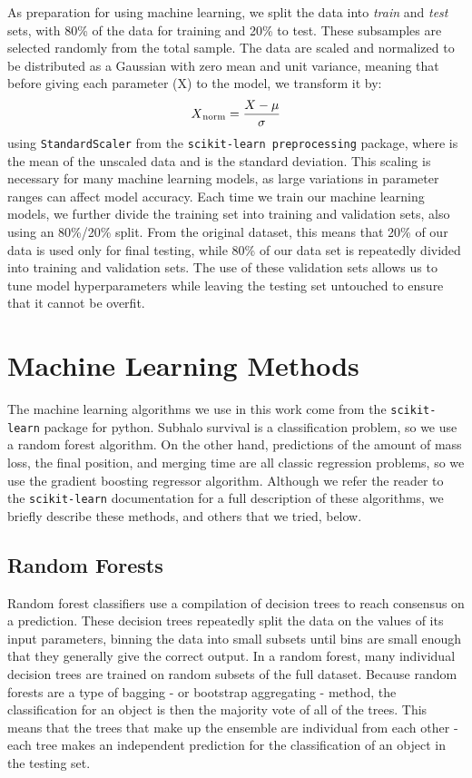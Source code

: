 \documentclass[fleqn,usenatbib]{mnras}
\begin{document}
\par
    As preparation for using machine learning, we split the data into \textit{train}  and \textit{test} sets, with 80\% of the data for training and 20\% to test. These subsamples are selected randomly from the total sample. The data are scaled and normalized to be distributed as a Gaussian with zero mean and unit variance, meaning that before giving each parameter (X) to the model, we transform it by: 
    \begin{equation}
        X\textsubscript{norm} = \frac{X - \mu}{\sigma}
    \end{equation} 
    using \texttt{StandardScaler} from the \texttt{scikit-learn preprocessing} package, where \textmu{} is the mean of the unscaled data and \textsigma{} is the standard deviation. This scaling is necessary for many machine learning models, as large variations in parameter ranges can affect model accuracy.
    Each time we train our machine learning models, we further divide the training set into training and validation sets, also using an 80\%/20\% split. From the original dataset, this means that 20\% of our data is used only for final testing, while 80\% of our data set is repeatedly divided into training and validation sets. The use of these validation sets allows us to tune model hyperparameters while leaving the testing set untouched to ensure that it cannot be overfit.

\section{Machine Learning Methods}
\label{sec:ML Methods}
The machine learning algorithms we use in this work come from the \texttt{scikit-learn} package for python. Subhalo survival is a classification problem, so we use a random forest algorithm. On the other hand, predictions of the amount of mass loss, the final position, and merging time are all classic regression problems, so we use the gradient boosting regressor algorithm. Although we refer the reader to the \texttt{scikit-learn} documentation for a full description of these algorithms, we briefly describe these methods, and others that we tried, below.

\subsection{Random Forests}
\label{sec:rf}
Random forest classifiers use a compilation of decision trees to reach consensus on a prediction. These decision trees repeatedly split the data on the values of its input parameters, binning the data into small subsets until bins are small enough that they generally give the correct output. In a random forest, many individual decision trees are trained on random subsets of the full dataset. Because random forests are a type of bagging - or bootstrap aggregating - method, the classification for an object is then the majority vote of all of the trees. This means that the trees that make up the ensemble are individual from each other - each tree makes an independent prediction for the classification of an object in the testing set.
\end{document}
